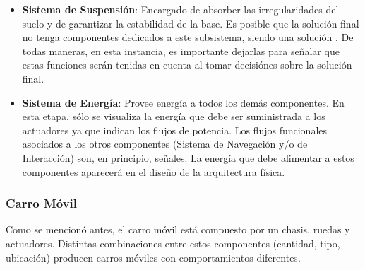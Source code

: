 \begin{itemize}
\begin{itemize}
\begin{enumerate}
			\item ir a la estación correspondiente a buscar productos
			\item ir a depósito/estación siguiente a dejarlos (a definir cómo se indica el destino)
		\end{enumerate}
	\end{itemize}
	\item \textbf{Sistema de Suspensión}: Encargado de absorber las irregularidades del suelo y de garantizar la estabilidad de la base. Es posible que la solución final no tenga componentes dedicados a este subsistema, siendo una solución . De todas maneras, en esta instancia, es importante dejarlas para señalar que estas funciones serán tenidas en cuenta al tomar decisiónes sobre la solución final.
	\item \textbf{Sistema de Energía}: Provee energía a todos los demás componentes. En esta etapa, sólo se visualiza la energía que debe ser suministrada a los actuadores ya que indican los flujos de potencia. Los flujos funcionales asociados a los otros componentes (Sistema de Navegación y/o de Interacción) son, en principio, señales. La energía que debe alimentar a estos componentes aparecerá en el diseño de la arquitectura física.
\end{itemize}


\subsubsection{Carro Móvil} \label{sec:carro_movil}

Como se mencionó antes, el carro móvil está compuesto por un chasis, ruedas y actuadores. Distintas combinaciones entre estos componentes (cantidad, tipo, ubicación) producen carros móviles con comportamientos diferentes. 

